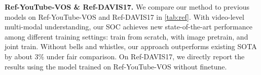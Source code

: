 \documentclass{article}
\begin{document}
\begin{table*}[t]
\begin{tabular}{l|c|ccc|ccc}
    \end{tabular}
    \caption{Comparison with the state-of-the-art methods on Ref-YouTube-VOS and Ref-DAVIS17 datasets. \textit{With Image Pretrain} denotes the models are first pretrained on RefCOCO~\cite{refcoco}, RefCOCO+~\cite{refcoco}, and RefCOCOg~\cite{grefcoco} datasets. \textit{Joint Train} indicates the models are trained with the combination of image datasets and video datasets.}
    \label{tab:ref}
    \vspace{-10pt}
\end{table*}

\textbf{Ref-YouTube-VOS \& Ref-DAVIS17.}
We compare our method to previous models on Ref-YouTube-VOS and Ref-DAVIS17 in \cref{tab:ref}.
With video-level multi-modal understanding, our SOC achieves new state-of-the-art performance among different training settings: train from scratch, with image pretrain, and joint train.
Without bells and whistles, our approach outperforms existing SOTA by about 3\%  under fair comparison. On Ref-DAVIS17, we directly report the results using the model trained on Ref-YouTube-VOS without finetune.
\end{document}
